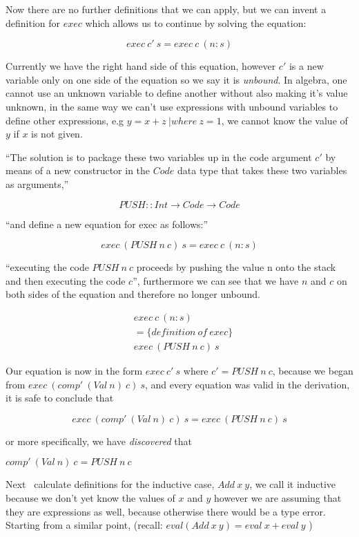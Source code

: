 \documentclass {article}
\begin{document}
Now there are no further definitions that we can apply,
but we can invent a definition for $exec$ which allows
us to continue by solving the equation:

	\[ exec \ c' \ s = exec \ c \ (n : s) \]

Currently we have the right hand side of this equation,
however $c'$ is a new variable only on one side of the equation
so we say it is \emph{unbound}.
In algebra, one cannot use an unknown variable to define
another without also making it's value unknown,
in the same way we can't use expressions with
unbound variables to define other expressions,
e.g \(y = x + z \ | where \ z = 1\), we cannot
know the value of $y$ if $x$ is not given.

``The solution is to package these two
variables up in the code argument $c'$
by means of a new constructor in the $Code$ data type
that takes these two variables as arguments,''

	\[ PUSH :: Int \rightarrow Code \rightarrow Code \]

``and define a new equation for exec as follows:''

	\[ exec \ (PUSH \ n \ c) \ s = exec \ c \ (n :s) \]

``executing the code $PUSH \ n \ c$ 
proceeds by pushing the value n onto the stack and
then executing the code $c$'', furthermore
we can see that we have $n$ and $c$ on both
sides of the equation and therefore no longer unbound.

\begin{align*}
	&exec \ c \ (n:s) \\
	&= \{definition \ of \ exec\} \\
	&exec \ (PUSH \ n \ c) \ s
\end{align*}

Our equation is now in the form $exec \ c' \ s$
where $c' = PUSH \ n \ c$, 
because we began from 
\(exec \ (comp' \ (Val \ n) \ c) \ s \),
and every equation was valid in the derivation,
it is safe to conclude that 

	\[exec \ (comp' \ (Val \ n) \ c) \ s = exec \ (PUSH \ n \ c) \ s\]

or more specifically, we have \emph{discovered} that 
	
	\( comp' \ (Val \ n) \ c =  PUSH \ n \ c \)

Next \BH\ calculate definitions for the inductive case, 
$Add \ x \ y$,
we call it inductive because we don't yet know 
the values of $x$ and $y$ however we are assuming
that they are expressions as well,
because otherwise there would be a type error.
Starting from a similar point,
(recall: \( eval (Add \  x \  y) = eval \  x + eval \  y  \) )
\end{document}
